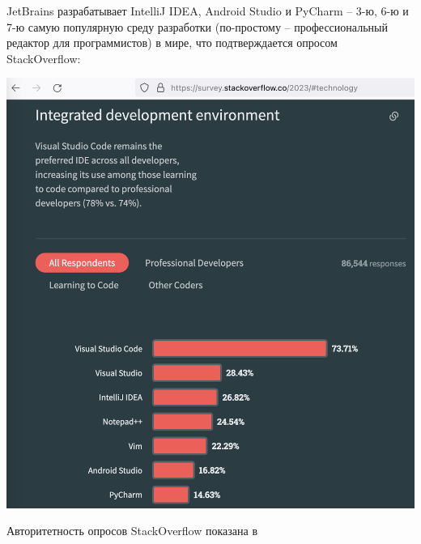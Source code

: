 JetBrains разрабатывает IntelliJ IDEA, Android Studio и PyCharm --
3-ю, 6-ю и 7-ю самую популярную
среду разработки (по-простому -- профессиональный редактор для программистов)
в мире, что подтверждается опросом StackOverflow:

\includegraphics[width=\textwidth]{jetbrains-popularity}

Авторитетность опросов StackOverflow показана в 

\pagebreak
